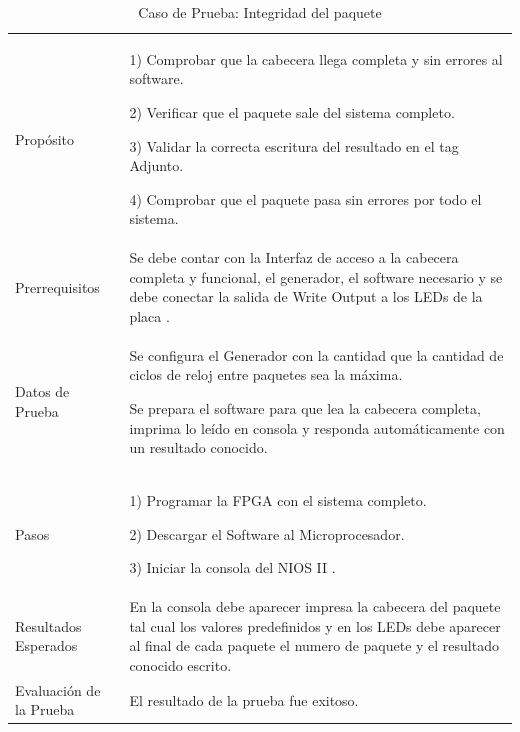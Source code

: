 \begin{table}
	\begin{tabular}{|>{\columncolor[gray]{0.8}}l|p{11cm}|} \hline
\multicolumn{2}{|>{\columncolor[gray]{0.8}}l|}{\textbf{Caso de Prueba: Integridad del paquete }}\\ \hline
Propósito  & 1) Comprobar que la cabecera llega completa y sin errores al software. 

2) Verificar que el paquete sale del sistema completo.

3) Validar la correcta escritura del resultado en el tag Adjunto.

4) Comprobar que el paquete pasa sin errores por todo el sistema. 
\\ \hline
 Prerrequisitos  & Se debe contar con la Interfaz de acceso a la cabecera completa y funcional, el generador, el software necesario y se debe conectar la salida de Write Output a los LEDs de la placa .\\ \hline
 Datos de Prueba & Se configura el Generador con la cantidad que la cantidad de ciclos de reloj entre paquetes sea la máxima. 

Se prepara el software para que lea la cabecera completa, imprima lo leído en consola y responda automáticamente con un resultado conocido. 
 \\ \hline
 Pasos & 1) Programar la FPGA con el sistema completo.

2) Descargar el Software al Microprocesador.

3) Iniciar la consola del NIOS II .
\\ \hline
 Resultados Esperados & En la consola debe aparecer impresa la cabecera del paquete tal cual los valores predefinidos y en los LEDs debe aparecer al final de cada paquete el numero de paquete y el resultado conocido escrito.  \\ \hline
 Evaluación de la Prueba  & El resultado de la prueba fue exitoso.\\ \hline
	\end{tabular}
	\caption{Caso de Prueba: Integridad del paquete}
	\label{tab:integridad}
\end{table}
